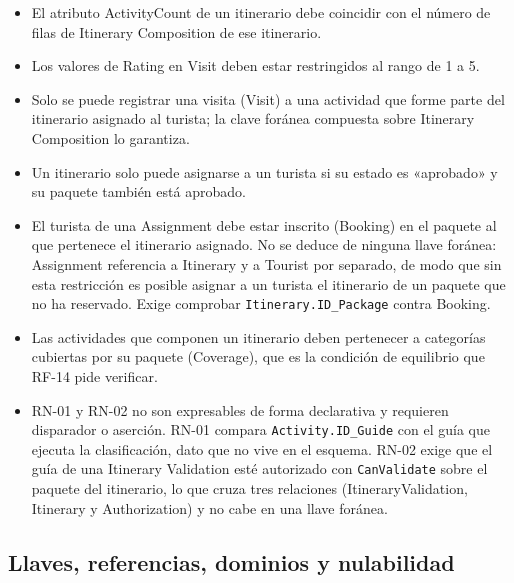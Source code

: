 \documentclass[11pt,a4paper]{article}
\begin{document}
\begin{itemize}[leftmargin=1.2em,itemsep=2pt,topsep=3pt]
\item El atributo ActivityCount de un itinerario debe coincidir con el número de filas de Itinerary Composition de ese itinerario.
\item Los valores de Rating en Visit deben estar restringidos al rango de 1 a 5.
\item Solo se puede registrar una visita (Visit) a una actividad que forme parte del itinerario asignado al turista; la clave foránea compuesta sobre Itinerary Composition lo garantiza.
\item Un itinerario solo puede asignarse a un turista si su estado es «aprobado» y su paquete también está aprobado.
\item El turista de una Assignment debe estar inscrito (Booking) en el paquete al que pertenece el itinerario asignado. No se deduce de ninguna llave foránea: Assignment referencia a Itinerary y a Tourist por separado, de modo que sin esta restricción es posible asignar a un turista el itinerario de un paquete que no ha reservado. Exige comprobar \texttt{Itinerary.ID\_\allowbreak{}Package} contra Booking.
\item Las actividades que componen un itinerario deben pertenecer a categorías cubiertas por su paquete (Coverage), que es la condición de equilibrio que RF-14 pide verificar.
\item RN-01 y RN-02 no son expresables de forma declarativa y requieren disparador o aserción. RN-01 compara \texttt{Activity.ID\_\allowbreak{}Guide} con el guía que ejecuta la clasificación, dato que no vive en el esquema. RN-02 exige que el guía de una Itinerary Validation esté autorizado con \texttt{CanValidate} sobre el paquete del itinerario, lo que cruza tres relaciones (ItineraryValidation, Itinerary y Authorization) y no cabe en una llave foránea.
\end{itemize}
\subsection{Llaves, referencias, dominios y nulabilidad}
\end{document}
